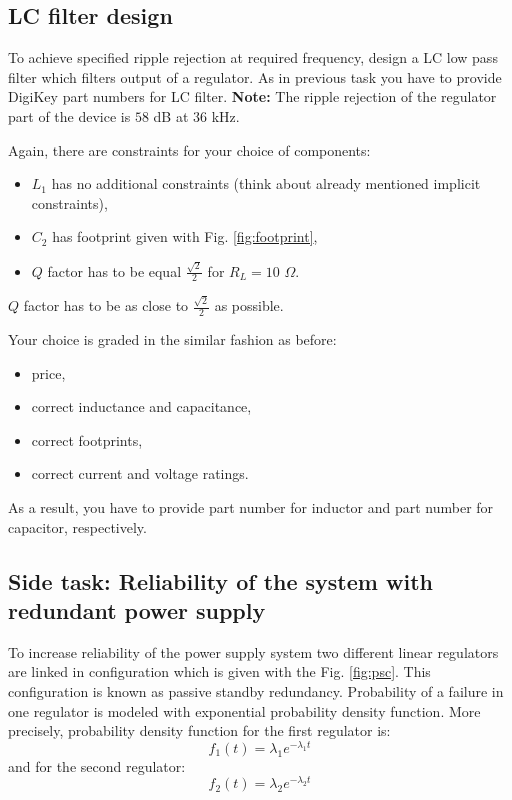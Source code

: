 \documentclass{article}
\begin{document}
\newpage

\subsection{LC filter design}
\label{ele:task:2}
To achieve specified ripple rejection at required frequency, design a LC low 
pass filter which filters output of a regulator. As in previous task you have 
to provide DigiKey part numbers for LC filter. \textbf{Note:} The ripple 
rejection of the regulator part of the device is $58$ dB at $36$ kHz.

Again, there are constraints for your choice of components:
\begin{itemize}
	\item $L_1$ has no additional constraints 
	(think about already mentioned implicit constraints),
	\item $C_2$ has footprint given with Fig. \ref{fig:footprint},
	\item $Q$ factor has to be equal $\frac{\sqrt{2}}{2}$ for $R_L = 10$ 
	$\Omega$.  
\end{itemize}
$Q$ factor has to be as close to $\frac{\sqrt{2}}{2}$ as possible. 

Your choice is graded in the similar fashion as before:
\begin{itemize}
	\item price,
	\item correct inductance and capacitance,
	\item correct footprints, 
	\item correct current and voltage ratings.
\end{itemize}
As a result, you have to provide part number for inductor and 
part number for capacitor, respectively. 
\newpage
\subsection{Side task: Reliability of the system with redundant power supply} 
\label{ele:task:3}
To increase reliability of the power supply system two different linear 
regulators are linked in configuration which is given with the Fig. 
\ref{fig:psc}. This configuration is known as passive standby redundancy. 
Probability of a failure in one regulator is modeled with exponential 
probability density function. More precisely, probability density function for 
the first regulator is:  
\begin{equation}
f_1(t) = \lambda_1 e^{-\lambda_1 t}
\end{equation}
and for the second regulator:
\begin{equation}
f_2(t) = \lambda_2 e^{-\lambda_2 t}
\end{equation}
\end{document}
